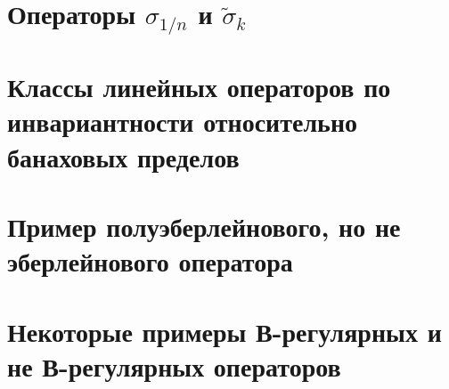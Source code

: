 \documentclass[12pt,a4paper,openbib]{report}
\theoremstyle{definition}
\begin{document}

	\section{Операторы $\sigma_{1/n}$ и $\tilde\sigma_k$}
	
	



	\section{Классы линейных операторов по инвариантности относительно банаховых пределов}
	

	\section{Пример полуэберлейнового, но не эберлейнового оператора}
	

	\section{Некоторые примеры В-регулярных и не В-регулярных операторов}
	
	

	

\end{document}
